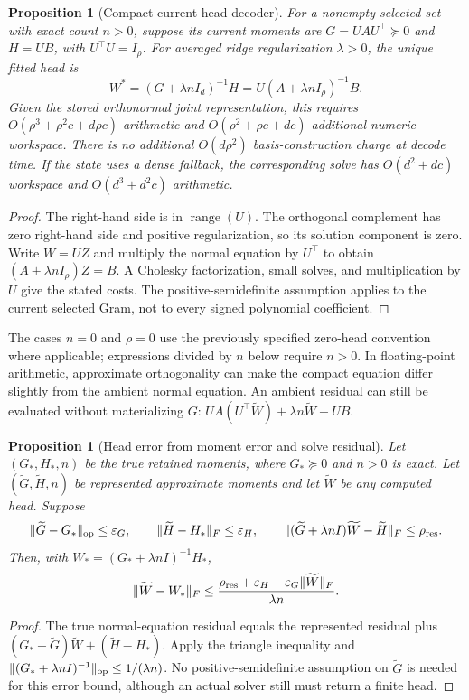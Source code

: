 \documentclass[11pt,a4paper]{article}
\newtheorem{proposition}[theorem]{Proposition}
\begin{document}
\begin{proposition}[Compact current-head decoder]
For a nonempty selected set with exact count $n>0$, suppose its current
moments are $G=UAU^\top\succeq0$ and $H=UB$, with $U^\top U=I_\rho$.
For averaged ridge regularization $\lambda>0$, the unique fitted head is
\[
 W^*=(G+\lambda nI_d)^{-1}H
     =U(A+\lambda nI_\rho)^{-1}B.
\]
Given the stored orthonormal joint representation, this requires
$O(\rho^3+\rho^2c+d\rho c)$ arithmetic and
$O(\rho^2+\rho c+dc)$ additional numeric workspace. There is no additional
$O(d\rho^2)$ basis-construction charge at decode time. If the state uses a
dense fallback, the corresponding solve has $O(d^2+dc)$ workspace and
$O(d^3+d^2c)$ arithmetic.
\end{proposition}
\begin{proof}
The right-hand side is in $\operatorname{range}(U)$. The orthogonal
complement has zero right-hand side and positive regularization, so its
solution component is zero. Write $W=UZ$ and multiply the normal equation
by $U^\top$ to obtain $(A+\lambda nI_\rho)Z=B$. A Cholesky factorization,
small solves, and multiplication by $U$ give the stated costs. The
positive-semidefinite assumption applies to the current selected Gram,
not to every signed polynomial coefficient.
\end{proof}

The cases $n=0$ and $\rho=0$ use the previously specified zero-head
convention where applicable; expressions divided by $n$ below require
$n>0$. In floating-point arithmetic, approximate orthogonality can make
the compact equation differ slightly from the ambient normal equation.
An ambient residual can still be evaluated without materializing $G$:
$UA(U^\top\widetilde W)+\lambda n\widetilde W-UB$.

\begin{proposition}[Head error from moment error and solve residual]
Let $(G_*,H_*,n)$ be the true retained moments, where $G_*\succeq0$ and
$n>0$ is exact. Let $(\widetilde G,\widetilde H,n)$ be represented
approximate moments and let $\widetilde W$ be any computed head. Suppose
\[
 \|\widetilde G-G_*\|_{\rm op}\le\varepsilon_G,
 \qquad \|\widetilde H-H_*\|_F\le\varepsilon_H,
 \qquad
 \|(\widetilde G+\lambda nI)\widetilde W-\widetilde H\|_F
       \le\rho_{\rm res}.
\]
Then, with $W_*=(G_*+\lambda nI)^{-1}H_*$,
\[
 \|\widetilde W-W_*\|_F
 \le\frac{\rho_{\rm res}+\varepsilon_H+
                      \varepsilon_G\|\widetilde W\|_F}{\lambda n}.
\]
\end{proposition}
\begin{proof}
The true normal-equation residual equals the represented residual plus
$(G_*-\widetilde G)\widetilde W+(\widetilde H-H_*)$.
Apply the triangle inequality and
$\|(G_*+\lambda nI)^{-1}\|_{\rm op}\le1/(\lambda n)$.
No positive-semidefinite assumption on $\widetilde G$ is needed for this
error bound, although an actual solver still must return a finite head.
\end{proof}
\end{document}
